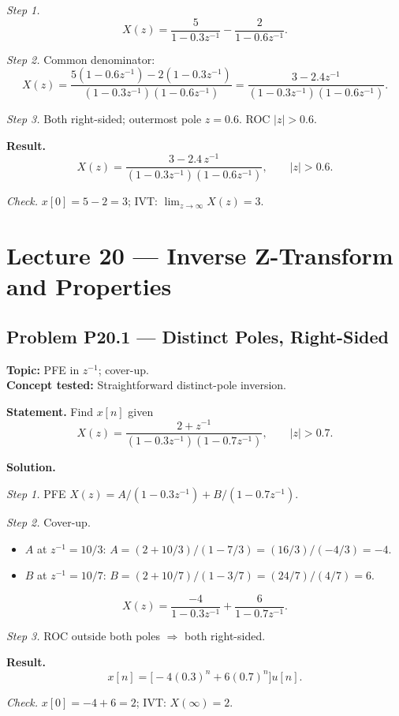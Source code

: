 \documentclass[11pt]{article}
\begin{document}
\textit{Step 1.}
\[
X(z) = \frac{5}{1-0.3z^{-1}}-\frac{2}{1-0.6z^{-1}}.
\]

\textit{Step 2.} Common denominator:
\[
X(z) = \frac{5(1-0.6z^{-1})-2(1-0.3z^{-1})}{(1-0.3z^{-1})(1-0.6z^{-1})}
= \frac{3 - 2.4z^{-1}}{(1-0.3z^{-1})(1-0.6z^{-1})}.
\]

\textit{Step 3.} Both right-sided; outermost pole $z=0.6$. ROC $|z|>0.6$.

\textbf{Result.}
\[
\boxed{\,X(z) = \frac{3 - 2.4\,z^{-1}}{(1-0.3z^{-1})(1-0.6z^{-1})},\qquad |z|>0.6.\,}
\]

\textit{Check.} $x[0] = 5-2 = 3$; IVT: $\lim_{z\to\infty}X(z) = 3$. \checkmark

\section{Lecture 20 --- Inverse Z-Transform and Properties}

\subsection{Problem P20.1 --- Distinct Poles, Right-Sided}
\textbf{Topic:} PFE in $z^{-1}$; cover-up.\\
\textbf{Concept tested:} Straightforward distinct-pole inversion.

\textbf{Statement.} Find $x[n]$ given
\[
X(z) = \frac{2+z^{-1}}{(1-0.3z^{-1})(1-0.7z^{-1})},\qquad |z|>0.7.
\]

\textbf{Solution.}

\textit{Step 1.} PFE $X(z) = A/(1-0.3z^{-1})+B/(1-0.7z^{-1})$.

\textit{Step 2.} Cover-up.
\begin{itemize}
\item $A$ at $z^{-1}=10/3$: $A = (2+10/3)/(1 - 7/3) = (16/3)/(-4/3) = -4$.
\item $B$ at $z^{-1}=10/7$: $B = (2+10/7)/(1 - 3/7) = (24/7)/(4/7) = 6$.
\end{itemize}
\[
X(z) = \frac{-4}{1-0.3z^{-1}}+\frac{6}{1-0.7z^{-1}}.
\]

\textit{Step 3.} ROC outside both poles $\Rightarrow$ both right-sided.

\textbf{Result.}
\[
\boxed{\,x[n] = \bigl[-4(0.3)^{n}+6(0.7)^{n}\bigr]u[n].\,}
\]

\textit{Check.} $x[0] = -4+6 = 2$; IVT: $X(\infty) = 2$. \checkmark
\end{document}
